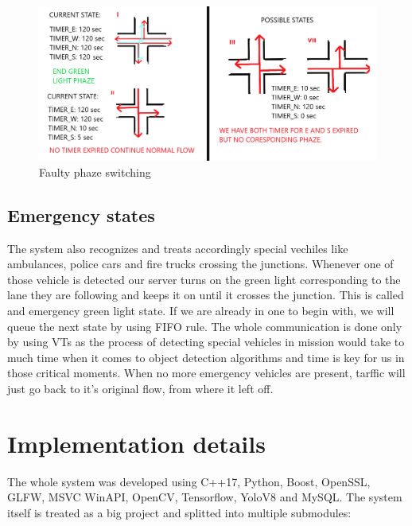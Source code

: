 \documentclass[17pt]{report}
\begin{document}
\begin{figure}[h!]
    \includegraphics[width=\textwidth]{Sketches/PhazeSwitchingCaseToBeAvoided.png}
    \caption{Faulty phaze switching}
    \label{fig:FaultyPhazeSwitching}
\end{figure}

\section{Emergency states}
\indent \indent
The system also recognizes and treats accordingly
special vechiles like ambulances, police cars and fire trucks
crossing the junctions. Whenever one of those vehicle is detected
our server turns on the green light corresponding to the lane they are
following and keeps it on until it crosses the junction. This is called 
and emergency green light state. If we are already
in one to begin with, we will queue the next state by using FIFO rule.
The whole communication is done only by using VTs as the process of detecting 
special vehicles in mission would take to much time when it comes to object 
detection algorithms and time is key for us in those critical moments.
When no more emergency vehicles are present, tarffic will just go 
back to it's original flow, from where it left off.

\pagebreak



\chapter{Implementation details}
\indent \indent
The whole system was developed using C++17, Python, Boost, OpenSSL, GLFW,
MSVC WinAPI, OpenCV, Tensorflow, YoloV8 and MySQL. The system itself is
treated as a big project and splitted into multiple submodules: 
\end{document}
